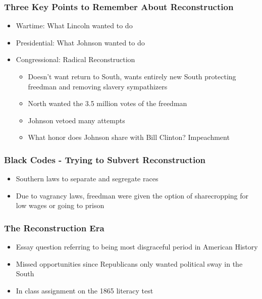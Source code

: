 \documentclass{article}
\begin{document}
 
\setcounter{secnumdepth}{0}

\subsubsection{Three Key Points to Remember About Reconstruction}

\begin{itemize}
    \item Wartime: What Lincoln wanted to do
    \item Presidential: What Johnson wanted to do
    \item Congressional: Radical Reconstruction
    \begin{itemize}
        \item Doesn't want return to South, wants entirely new South protecting freedman and removing slavery sympathizers
        \item North wanted the 3.5 million votes of the freedman
        \item Johnson vetoed many attempts
        \item What honor does Johnson share with Bill Clinton? Impeachment
    \end{itemize}

\end{itemize}
\subsubsection{Black Codes - Trying to Subvert Reconstruction}

\begin{itemize}
    \item Southern laws to separate and segregate races
    \item Due to vagrancy laws, freedman were given the option of sharecropping for low wages or going to prison
\end{itemize}

\subsubsection{The Reconstruction Era}

\begin{itemize}
    \item Essay question referring to being most disgraceful period in American History
    \item Missed opportunities since Republicans only wanted political sway in the South
    \item In class assignment on the 1865 literacy test
\end{itemize}
\end{document}
